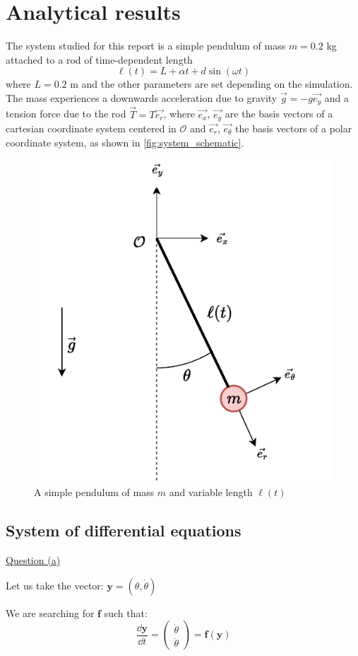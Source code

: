 \section{Analytical results}

The system studied for this report is a simple pendulum of mass \(m=0.2\) kg attached to a rod of time-dependent length
\begin{equation}
    \ell(t) = L + \alpha t + d \sin (\omega t)
\end{equation}
where \(L=0.2\) m and the other parameters are set depending on the simulation. The mass experiences a downwards acceleration due to gravity \(\vec{g}=-g \vec{e_y}\) and a tension force due to the rod \(\vec{T} = T \vec{e_r}\), where \(\vec{e_x}\), \(\vec{e_y}\) are the basis vectors of a cartesian coordinate system centered in \(\mathcal O\) and \(\vec{e_r}\), \(\vec{e_\theta}\) the basis vectors of a polar coordinate system, as shown in \autoref{fig:system_schematic}.

\begin{figure}[h]
    \centering
    \includegraphics[width=0.6\linewidth]{figures/system_schematic.pdf}
    \caption{A simple pendulum of mass \(m\) and variable length \(\ell(t)\)}
    \label{fig:system_schematic}
\end{figure}

\subsection{System of differential equations}
\underline{Question (a)}

Let us take the vector: $\mathbf{y} = (\theta, \dot\theta)$

We are searching for $\mathbf{f}$ such that:
\begin{equation}
    \frac{\dd \mathbf{y}}{\dd t} = \left(\begin{matrix} \dot\theta \\ \ddot\theta \end{matrix}\right) = \mathbf{f}(\mathbf{y})
    \label{eq:a_question}
\end{equation}

